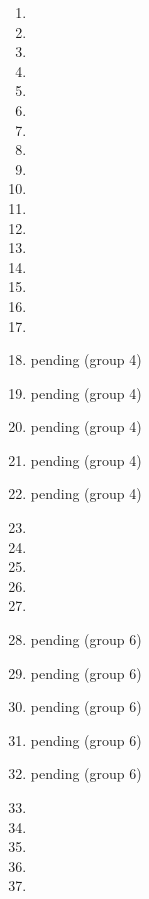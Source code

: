 \documentclass[12pt]{article}
\begin{document}


\begin{enumerate}
    \item 
    \item 
    \item 
    \item 
    \item 
    
    \item 
    \item 
    \item 
    \item 
    \item 
    \item 
    
    \item 
    \item 
    \item 
    \item 
    \item 
    \item  
    
    \item pending (group 4)
    \item pending (group 4)
    \item pending (group 4)
    \item pending (group 4)
    \item pending (group 4)
    
    \item 
    \item 
    \item 
    \item 
    \item 
    
    \item pending (group 6)
    \item pending (group 6)
    \item pending (group 6)
    \item pending (group 6)
    \item pending (group 6)
    
    \item 
    \item  
    \item   
    \item 
    \item  
    

\end{enumerate}
\end{document}
